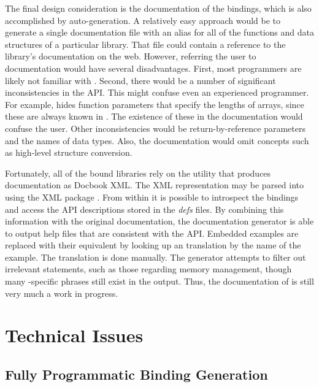 \documentclass[article]{jss}
\begin{document}
The final design consideration is the documentation of the bindings,
which is also accomplished by auto-generation. A relatively easy
approach
would be to generate a single documentation file with an alias for all
of
the functions and data structures of a particular library. That file
could
contain a reference to the library's  documentation on the
web. 
However, referring the user to  documentation would have
several disadvantages. First, most  programmers are likely
not
familiar with . Second, there would be a
number of significant inconsistencies in the API. This might confuse
even an experienced  programmer.
For example,  hides function parameters that specify the
lengths of 
arrays, since these are always known in . The existence of
these in 
the  documentation would confuse the  user.
Other 
inconsistencies would be return-by-reference parameters and the names
of data 
types. Also, the  documentation would omit concepts such
as
high-level structure conversion.

Fortunately, all of the bound libraries rely on the 
utility that 
produces documentation as Docbook XML. The XML representation may be
parsed into  using the XML package \citep{XML}. From
within  it is possible
to introspect the bindings and access the API descriptions stored
in the \emph{defs} files. By combining this information with the
original 
documentation, the documentation generator is able to output
 help
files that are consistent with the  API. Embedded
examples are replaced with their  equivalent by looking up
an  translation by the name of the example. The
translation is
done manually. The generator attempts to filter out irrelevant
statements, 
such as those  regarding memory management, though many
-specific 
phrases still exist in the output. Thus, the documentation of
is still very much a work in progress.

\section{Technical Issues}

\subsection{Fully Programmatic Binding Generation}
\end{document}
